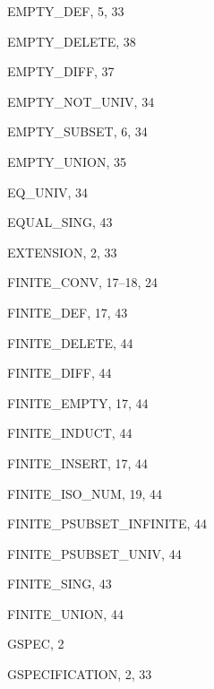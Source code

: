 \begin{theindex}
  \indexspace

  \item {\ptt EMPTY\_DEF}, 5, 33
  \item {\ptt EMPTY\_DELETE}, 38
  \item {\ptt EMPTY\_DIFF}, 37
  \item {\ptt EMPTY\_NOT\_UNIV}, 34
  \item {\ptt EMPTY\_SUBSET}, 6, 34
  \item {\ptt EMPTY\_UNION}, 35
  \item {\ptt EQ\_UNIV}, 34
  \item {\ptt EQUAL\_SING}, 43
  \item {\ptt EXTENSION}, 2, 33

  \indexspace

  \item {\ptt FINITE\_CONV}, 17--18, 24
  \item {\ptt FINITE\_DEF}, 17, 43
  \item {\ptt FINITE\_DELETE}, 44
  \item {\ptt FINITE\_DIFF}, 44
  \item {\ptt FINITE\_EMPTY}, 17, 44
  \item {\ptt FINITE\_INDUCT}, 44
  \item {\ptt FINITE\_INSERT}, 17, 44
  \item {\ptt FINITE\_ISO\_NUM}, 19, 44
  \item {\ptt FINITE\_PSUBSET\_INFINITE}, 44
  \item {\ptt FINITE\_PSUBSET\_UNIV}, 44
  \item {\ptt FINITE\_SING}, 43
  \item {\ptt FINITE\_UNION}, 44

  \indexspace

  \item {\ptt GSPEC}, 2
  \item {\ptt GSPECIFICATION}, 2, 33

  \indexspace


\end{theindex}
